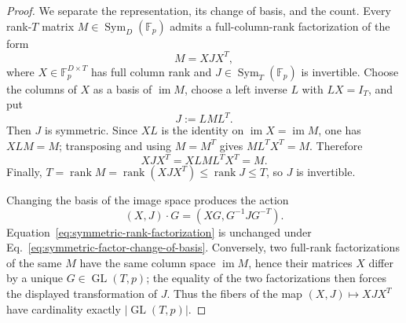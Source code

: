 \documentclass[11pt]{article}
\newcommand{\F}{\mathbb F}
\newcommand{\Sym}{\operatorname{Sym}}
\newcommand{\rank}{\operatorname{rank}}
\newcommand{\1}{\mathbf 1}
\theoremstyle{plain}
\theoremstyle{definition}
\theoremstyle{remark}
\begin{document}
\begin{proof}
We separate the representation, its change of basis, and the count.
Every rank-$T$ matrix $M\in\Sym_D(\F_p)$ admits a full-column-rank
factorization of the form
\begin{equation}
 M=XJX^T,
 \label{eq:symmetric-rank-factorization}
\end{equation}
where $X\in\F_p^{D\times T}$ has full column rank and
$J\in\Sym_T(\F_p)$ is invertible.  Choose the columns of $X$ as a basis of
$\operatorname{im}M$, choose a left inverse $L$ with $LX=I_T$, and put
\begin{equation}
 J:=LML^T.
 \label{eq:v84-symmetric-factor-J}
\end{equation}
Then $J$ is symmetric.  Since $XL$ is the identity on
$\operatorname{im}X=\operatorname{im}M$, one has $XLM=M$; transposing and
using $M=M^T$ gives $ML^TX^T=M$.  Therefore
\begin{equation}
 XJX^T=XLML^TX^T=M.
 \label{eq:v84-symmetric-factor-verification}
\end{equation}
Finally,
$T=\rank M=\rank(XJX^T)\le\rank J\le T$, so $J$ is invertible.

Changing the basis of the image space produces the action
\begin{equation}
 (X,J)\cdot G=(XG,G^{-1}JG^{-T}).
 \label{eq:symmetric-factor-change-of-basis}
\end{equation}
Equation~\eqref{eq:symmetric-rank-factorization} is unchanged under
Eq.~\eqref{eq:symmetric-factor-change-of-basis}.  Conversely, two full-rank
factorizations of the same $M$ have the same column space
$\operatorname{im}M$, hence their matrices $X$ differ by a unique
$G\in\operatorname{GL}(T,p)$; the equality of the two factorizations then
forces the displayed transformation of $J$.  Thus the fibers of the map
$(X,J)\mapsto XJX^T$ have cardinality exactly
$|\operatorname{GL}(T,p)|$.


\end{proof}
\end{document}
